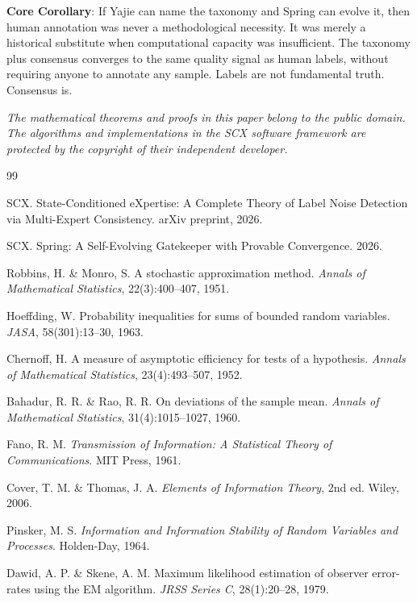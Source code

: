 \documentclass[12pt,a4paper]{article}
\theoremstyle{definition}
\theoremstyle{remark}
\begin{document}
\textbf{Core Corollary}: If Yajie can name the taxonomy and Spring can evolve it, then human annotation was never a methodological necessity. It was merely a historical substitute when computational capacity was insufficient. The taxonomy plus consensus converges to the same quality signal as human labels, without requiring anyone to annotate any sample. Labels are not fundamental truth. Consensus is.

\bigskip
\noindent\textit{The mathematical theorems and proofs in this paper belong to the public domain. The algorithms and implementations in the SCX software framework are protected by the copyright of their independent developer.}

\begin{thebibliography}{99}

 SCX. State-Conditioned eXpertise: A Complete Theory of Label Noise Detection via Multi-Expert Consistency. arXiv preprint, 2026.

 SCX. Spring: A Self-Evolving Gatekeeper with Provable Convergence. 2026.

 Robbins, H. \& Monro, S. A stochastic approximation method. \textit{Annals of Mathematical Statistics}, 22(3):400–407, 1951.

 Hoeffding, W. Probability inequalities for sums of bounded random variables. \textit{JASA}, 58(301):13–30, 1963.

 Chernoff, H. A measure of asymptotic efficiency for tests of a hypothesis. \textit{Annals of Mathematical Statistics}, 23(4):493–507, 1952.

 Bahadur, R. R. \& Rao, R. R. On deviations of the sample mean. \textit{Annals of Mathematical Statistics}, 31(4):1015–1027, 1960.

 Fano, R. M. \textit{Transmission of Information: A Statistical Theory of Communications}. MIT Press, 1961.

 Cover, T. M. \& Thomas, J. A. \textit{Elements of Information Theory}, 2nd ed. Wiley, 2006.

 Pinsker, M. S. \textit{Information and Information Stability of Random Variables and Processes}. Holden-Day, 1964.

 Dawid, A. P. \& Skene, A. M. Maximum likelihood estimation of observer error-rates using the EM algorithm. \textit{JRSS Series C}, 28(1):20–28, 1979.


\end{thebibliography}
\end{document}

